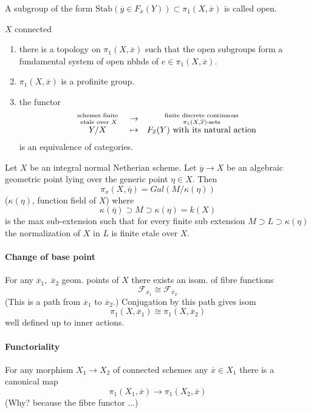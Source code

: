 \begin{definition}A subgroup of the form $\text{Stab}(\overline y\in 
F_{\overline x}(Y))\subset \pi_1(X, \overline x)$ is called open.
\end{definition}

\begin{theorem} $X$ connected
	\begin{enumerate}
	\item there is a topology on $\pi_1(X, \overline x)$ such that the open 
subgroups form a fundamental system of open nbhds of $e\in \pi_1(X, \overline 
x)$.
	\item $\pi_1(X, \overline x)$ is a profinite group.
	\item the functor 
		$$\begin{array}{cccccc}
		\text{ schemes finite }\atop \text{ etale over }X & \to & 
\text{ finite discrete continuous }\atop \pi_1(X, \overline x)\text{-sets}\\
		Y /  X& \mapsto & F_{\overline x}(Y) \text{ with its natural 
action}
		\end{array}$$
		is an equivalence of categories. 
	\end{enumerate}
\end{theorem}

\begin{proposition} Let $X$ be an integral normal Netherian scheme. Let 
$\overline y\to X$ be an algebraic geometric point lying over the generic point 
$\eta\in X$. Then
	$$\pi_x(X, \overline \eta) = Gal(M/\kappa(\eta))$$
	($\kappa(\eta)$, function field of $X$) where
	$$\kappa(\overline \eta)\supset M\supset \kappa(\eta) = k(X)$$
	is the max sub-extension such that for every finite sub extension 
$M\supset L\supset \kappa(\eta)$ the normalization of $X$ in $L$ is finite 
etale over $X$. 
\end{proposition}

\paragraph{Change of base point} For any $\overline x_1, \; \overline x_2$  
geom. points of $X$ there exists an isom. of fibre functions
	$$\mathcal{F}_{\overline x_1} \cong \mathcal{F}_{\overline x_2}$$
	(This is a path from $\overline x_1$ to $\overline x_2$.) Conjugation 
by this path gives isom
		$$\pi_1(X, \overline x_1) \cong \pi_1(X, \overline x_2)$$
		well defined up to inner actions. 

\paragraph{Functoriality} For any morphism $X_1\to X_2$ of connected schemes 
any $\overline x\in X_1$ there is a canonical map
	$$\pi_1(X_1, \overline x) \to \pi_1(X_2, \overline x)$$
(Why? because the fibre functor ...)

